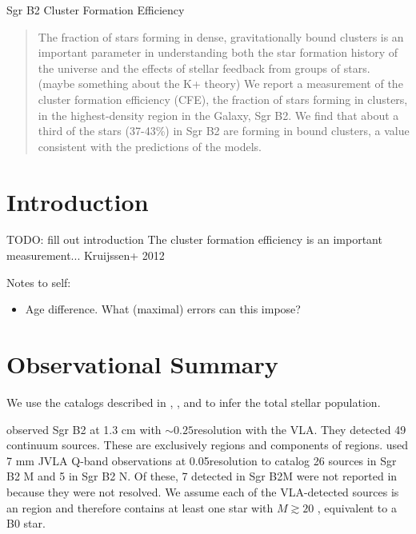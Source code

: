 \documentclass[twocolumn]{aastex61}
\begin{document}
Sgr B2 Cluster Formation Efficiency

\begin{abstract}
    The fraction of stars forming in dense, gravitationally bound clusters is
    an important parameter in understanding both the star formation history of
    the universe and the effects of stellar feedback from groups of stars.
    (maybe something about the K+ theory)
    We report a measurement of the cluster formation efficiency (CFE), the
    fraction of stars forming in clusters, in the highest-density region in
    the Galaxy, Sgr B2.  We find that about a third of the stars (37-43\%) in
    Sgr B2 are forming in bound clusters, a value consistent with the
    predictions of the \citet{Kruijssen2012a} models.
\end{abstract}

\section{Introduction}

{\color{red}TODO: fill out introduction}
The cluster formation efficiency is an important measurement...
Kruijssen+ 2012

{\color{red}
Notes to self:
\begin{itemize}
    \item Age difference.  What (maximal) errors can this impose?
\end{itemize}
}

\section{Observational Summary}

We use the catalogs described in \citet{Ginsburg2018a}, \citet{Gaume1995a}, and
\citet{De-Pree2015a} to infer the total stellar population.

\citet{Gaume1995a} observed Sgr B2 at 1.3 cm with $\sim0.25$\arcsec resolution
with the VLA.  They detected 49 continuum sources.  These are exclusively \hii
regions and components of \hii regions.  \citet{De-Pree2015a} used 7 mm JVLA
Q-band observations at 0.05\arcsec resolution to catalog 26 sources in Sgr B2 M
and 5 in Sgr B2 N.  Of these, 7 detected in Sgr B2M were not reported in
\citet{Gaume1995a} because they were not resolved.  We assume each of the
VLA-detected sources is an \hii region and therefore contains at least one star
with $M\gtrsim20$ \msun, equivalent to a B0 star.
\end{document}
